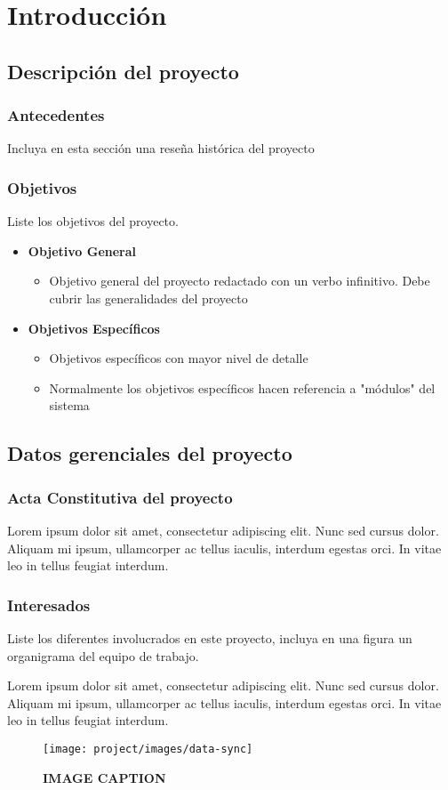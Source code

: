 \chapter{Introducción}
\section{Descripción del proyecto}
\subsection{Antecedentes}
Incluya en esta sección una reseña histórica del proyecto 
\subsection{Objetivos}
Liste los objetivos del proyecto.
\begin{itemize}
    \item \textbf{Objetivo General}
    \begin{itemize}
        \item Objetivo general del proyecto redactado con un verbo infinitivo. Debe cubrir las generalidades del proyecto
    \end{itemize}
    \item \textbf{Objetivos Específicos}
    \begin{itemize}
        \item Objetivos específicos con mayor nivel de detalle
        \item Normalmente los objetivos específicos hacen referencia a "módulos" del sistema
    \end{itemize}
\end{itemize}
\section{Datos gerenciales del proyecto}
\subsection{Acta Constitutiva del proyecto}
Lorem ipsum dolor sit amet, consectetur adipiscing elit. Nunc sed cursus dolor. Aliquam mi ipsum, ullamcorper ac tellus iaculis, interdum egestas orci. In vitae leo in tellus feugiat interdum.

\subsection{Interesados}
Liste los diferentes involucrados en este proyecto, incluya en una figura un organigrama del equipo de trabajo.

Lorem ipsum dolor sit amet, consectetur adipiscing elit. Nunc sed cursus dolor. Aliquam mi ipsum, ullamcorper ac tellus iaculis, interdum egestas orci. In vitae leo in tellus feugiat interdum.


\begin{figure}[H]
  \centering
    \texttt{[image: project/images/data-sync]}
  \caption{\textbf{IMAGE CAPTION}}
\end{figure}

